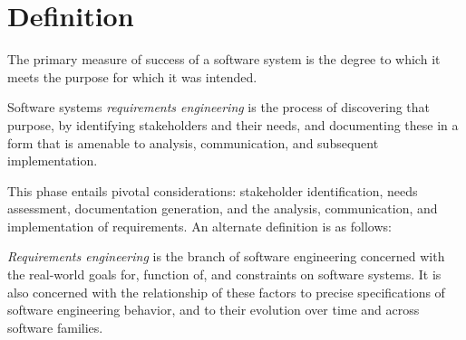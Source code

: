 \documentclass[12pt, a4paper]{report}
\begin{document}
    \section{Definition}
    The primary measure of success of a software system is the degree to which it meets the purpose for which it was intended.
    \begin{definition}
        Software systems \emph{requirements engineering} is the process of discovering that purpose, by identifying stakeholders and their needs, and documenting these in a form that is amenable to analysis, communication, and subsequent implementation. 
    \end{definition}
    This phase entails pivotal considerations: stakeholder identification, needs assessment, documentation generation, and the analysis, communication, and implementation of requirements. 
    An alternate definition is as follows:
    \begin{definition}
        \emph{Requirements engineering} is the branch of software engineering concerned with the real-world goals for, function of, and constraints on software systems. 
        It is also concerned with the relationship of these factors to precise specifications of software engineering behavior, and to their evolution over time and across software families. 
    \end{definition}
\end{document}
